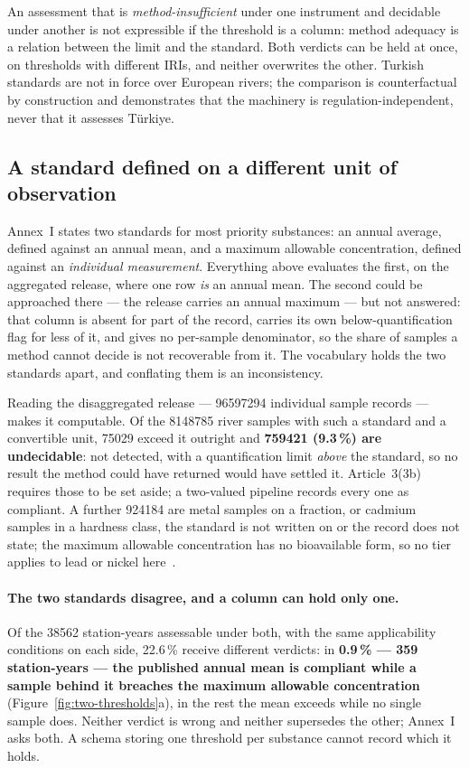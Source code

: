 An assessment that is \emph{method-insufficient} under one instrument and
decidable under another is not expressible if the threshold is a column:
method adequacy is a relation between the limit and the standard. Both verdicts
can be held at once, on thresholds with different IRIs, and neither overwrites
the other. Turkish standards are not in force over European rivers; the
comparison is counterfactual by construction and demonstrates that the
machinery is regulation-independent, never that it assesses Türkiye.

\subsection{A standard defined on a different unit of observation}
\label{sec:results-mac}
Annex~I states two standards for most priority substances: an annual average,
defined against an annual mean, and a maximum allowable concentration, defined
against an \emph{individual measurement}. Everything above evaluates the first,
on the aggregated release, where one row \emph{is} an annual mean. The second
could be approached there --- the release carries an annual maximum --- but not
answered: that column is absent for part of the record, carries its own
below-quantification flag for less of it, and gives no per-sample denominator,
so the share of samples a method cannot decide is not recoverable from it. The
vocabulary holds the two standards apart, and conflating them is an
inconsistency.

Reading the disaggregated release --- \num{96597294} individual sample records
--- makes it computable. Of the \num{8148785}
river samples with such a standard and a convertible unit, \num{75029} exceed it outright and \textbf{\num{759421} (\num{9.3}\,\%) are undecidable}: not
detected, with a quantification limit \emph{above} the standard, so no result
the method could have returned would have settled it. Article~3(3b) requires
those to be set aside; a two-valued pipeline records every one as compliant. A
further \num{924184} are metal samples on a fraction, or cadmium samples in a
hardness class, the standard is not written on or the record does not state; the
maximum allowable concentration has no bioavailable form, so no tier applies to
lead or nickel here~\cite{eu2019gd38}.

\paragraph{The two standards disagree, and a column can hold only one.}
Of the \num{38562} station-years assessable under both, with the same
applicability conditions on each side,
\num{22.6}\,\% receive different verdicts: in \textbf{\num{0.9}\,\% --- \num{359} station-years --- the published annual mean is compliant while
a sample behind it breaches the maximum allowable concentration}
(Figure~\ref{fig:two-thresholds}a), in the rest the mean exceeds while no
single sample does. Neither verdict is wrong and neither supersedes the other;
Annex~I asks both. A schema storing one threshold per substance cannot record
which it holds.

